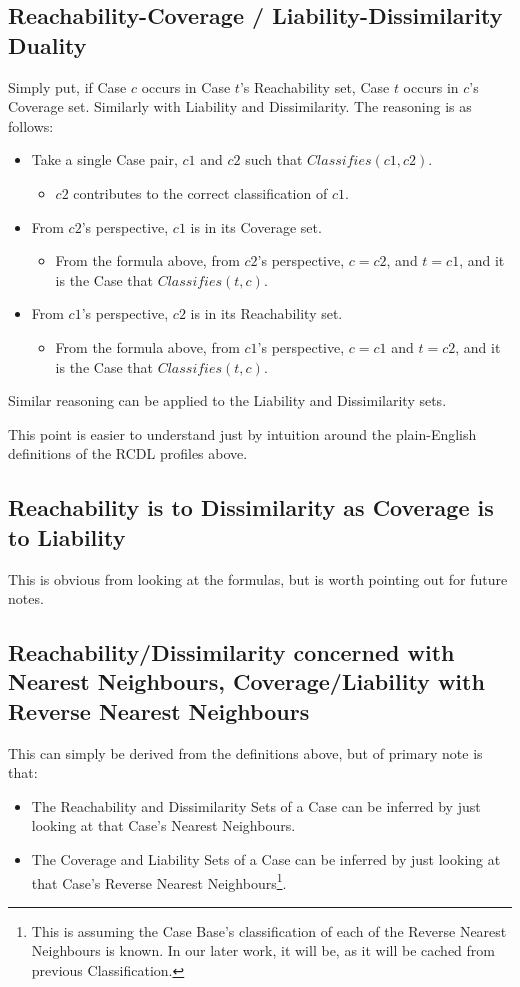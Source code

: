 \documentclass[a4paper,11pt]{report}
\begin{document}
\subsection{Reachability-Coverage / Liability-Dissimilarity Duality\label{sec:duality}}
Simply put, if Case $c$ occurs in Case $t$'s Reachability set, Case $t$ occurs in $c$'s Coverage set. Similarly with Liability and Dissimilarity.
The reasoning is as follows:
\begin{itemize}
	\item Take a single Case pair, $c1$ and $c2$ such that $Classifies(c1, c2)$.
	\begin{itemize}
		\item $c2$ contributes to the correct classification of $c1$.
	\end{itemize}
	\item From $c2$'s perspective, $c1$ is in its Coverage set.
	\begin{itemize}
		\item From the formula above, from $c2$'s perspective, $c=c2$, and $t=c1$, and it is the Case that $Classifies(t, c)$.
	\end{itemize}
	\item From $c1$'s perspective, $c2$ is in its Reachability set.
	\begin{itemize}
		\item From the formula above, from $c1$'s perspective, $c=c1$ and $t=c2$, and it is the Case that $Classifies(t, c)$.
	\end{itemize}
\end{itemize}

Similar reasoning can be applied to the Liability and Dissimilarity sets.

This point is easier to understand just by intuition around the plain-English definitions of the RCDL profiles above.

\subsection{Reachability is to Dissimilarity as Coverage is to Liability}
This is obvious from looking at the formulas, but is worth pointing out for future notes.

\subsection{Reachability/Dissimilarity concerned with Nearest Neighbours, Coverage/Liability with Reverse Nearest Neighbours \label{sec:RdWithNnClWithRnn}}
This can simply be derived from the definitions above, but of primary note is that:
\begin{itemize}
	\item The Reachability and Dissimilarity Sets of a Case can be inferred by just looking at that Case's Nearest Neighbours.
	\item The Coverage and Liability Sets of a Case can be inferred by just looking at that Case's Reverse Nearest Neighbours\footnote{This is assuming the Case Base's classification of each of the Reverse Nearest Neighbours is known. In our later work, it will be, as it will be cached from previous Classification.}.
\end{itemize}
\end{document}
